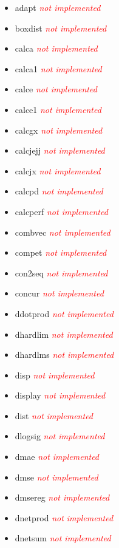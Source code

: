 \begin{itemize}
	\item adapt \textcolor{red}{\textit{not implemented}}
	\item boxdist \textcolor{red}{\textit{not implemented}}
	\item calca \textcolor{red}{\textit{not implemented}}
	\item calca1 \textcolor{red}{\textit{not implemented}}
	\item calce \textcolor{red}{\textit{not implemented}}
	\item calce1 \textcolor{red}{\textit{not implemented}}
	\item calcgx \textcolor{red}{\textit{not implemented}}
	\item calcjejj \textcolor{red}{\textit{not implemented}}
	\item calcjx \textcolor{red}{\textit{not implemented}}
	\item calcpd \textcolor{red}{\textit{not implemented}}
	\item calcperf \textcolor{red}{\textit{not implemented}}
	\item combvec \textcolor{red}{\textit{not implemented}}
	\item compet \textcolor{red}{\textit{not implemented}}
	\item con2seq \textcolor{red}{\textit{not implemented}}
	\item concur \textcolor{red}{\textit{not implemented}}
	\item ddotprod \textcolor{red}{\textit{not implemented}}
	\item dhardlim \textcolor{red}{\textit{not implemented}}
	\item dhardlms \textcolor{red}{\textit{not implemented}}
	\item disp \textcolor{red}{\textit{not implemented}}
	\item display \textcolor{red}{\textit{not implemented}} 
	\item dist \textcolor{red}{\textit{not implemented}}
	\item dlogsig \textcolor{red}{\textit{not implemented}}
	\item dmae \textcolor{red}{\textit{not implemented}}
	\item dmse \textcolor{red}{\textit{not implemented}}
	\item dmsereg \textcolor{red}{\textit{not implemented}}
	\item dnetprod \textcolor{red}{\textit{not implemented}}
	\item dnetsum \textcolor{red}{\textit{not implemented}}

\end{itemize}
